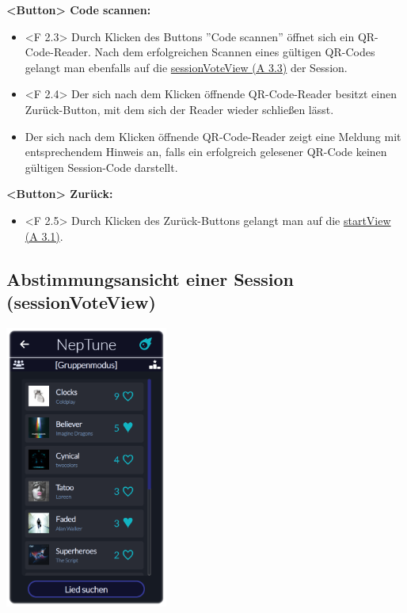 \documentclass[oneside, ngerman]{sdqtechreport}
\begin{document}
\textbf{<Button> Code scannen:}
\begin{itemize}
    \hypertarget{<F 2.3>}{}
    \item <F 2.3> Durch Klicken des Buttons ''Code scannen'' öffnet sich ein QR-Code-Reader. Nach dem erfolgreichen Scannen eines gültigen QR-Codes gelangt man ebenfalls auf die \hyperlink{sessionVoteView}{sessionVoteView (A 3.3)} der Session.
    \hypertarget{<F 2.4>}{}
    \item <F 2.4> Der sich nach dem Klicken öffnende QR-Code-Reader besitzt einen Zurück-Button, mit dem sich der Reader wieder schließen lässt.
    \item Der sich nach dem Klicken öffnende QR-Code-Reader zeigt eine Meldung mit entsprechendem Hinweis an, falls ein erfolgreich gelesener QR-Code keinen gültigen Session-Code darstellt.
\end{itemize}

\textbf{<Button> Zurück:}
\begin{itemize}
    \hypertarget{<F 2.5>}{}
    \item <F 2.5> Durch Klicken des Zurück-Buttons gelangt man auf die \hyperlink{startView}{startView (A 3.1)}.
\end{itemize}



\subsection{Abstimmungsansicht einer Session (sessionVoteView)}
\label{sec:Benutzeroberfläche:sessionVoteView}

\begin{center}
    \hypertarget{sessionVoteView}{}
    \includegraphics[width=0.4\textwidth]{LATEX/Pflichtenheft/GraphicDesigns/userVotePage.png}
\end{center}
\end{document}
